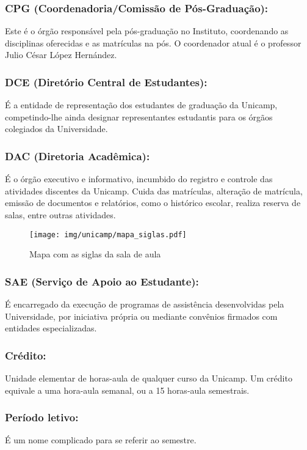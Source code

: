 \subsubsection{CPG (Coordenadoria/Comissão de Pós-Graduação):} Este é o órgão
responsável pela pós-graduação no Instituto, coordenando as disciplinas
oferecidas e as matrículas na pós. O coordenador atual é o professor Julio
César López Hernández.

\subsubsection{DCE (Diretório Central de Estudantes):} É a entidade de
representação dos estudantes de graduação da Unicamp, competindo-lhe ainda
designar representantes estudantis para os órgãos colegiados da Universidade.

\subsubsection{DAC (Diretoria Acadêmica):} É o órgão executivo e informativo,
incumbido do registro e controle das atividades discentes da Unicamp. Cuida das
matrículas, alteração de matrícula, emissão de documentos e relatórios, como o
histórico escolar, realiza reserva de salas, entre outras atividades.

\begin{figure*}[hb!]  \centering
  \texttt{[image: img/unicamp/mapa\_siglas.pdf]}
  \caption{Mapa com as siglas da sala de aula}
  \label{fig:mapa_siglas}
\end{figure*}

\subsubsection{SAE (Serviço de Apoio ao Estudante):} É encarregado da execução
de programas de assistência desenvolvidas pela Universidade, por iniciativa
própria ou mediante convênios firmados com entidades especializadas.

\subsubsection{Crédito:} Unidade elementar de horas-aula de qualquer curso da
Unicamp. Um crédito equivale a uma hora-aula semanal, ou a 15 horas-aula
semestrais.

\subsubsection{Período letivo:} É um nome complicado para se referir ao
semestre.

